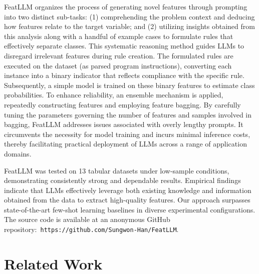 \textsf{FeatLLM} organizes the process of generating novel features through prompting into two distinct sub-tasks: (1) comprehending the problem context and deducing how features relate to the target variable; and (2) utilizing insights obtained from this analysis along with a handful of example cases to formulate rules that effectively separate classes. This systematic reasoning method guides LLMs to disregard irrelevant features during rule creation. The formulated rules are executed on the dataset (as parsed program instructions), converting each instance into a binary indicator that reflects compliance with the specific rule. Subsequently, a simple model is trained on these binary features to estimate class probabilities. To enhance reliability, an ensemble mechanism is applied, repeatedly constructing features and employing feature bagging. By carefully tuning the parameters governing the number of features and samples involved in bagging, \textsf{FeatLLM} addresses issues associated with overly lengthy prompts. It circumvents the necessity for model training and incurs minimal inference costs, thereby facilitating practical deployment of LLMs across a range of application domains.

\textsf{FeatLLM} was tested on 13 tabular datasets under low-sample conditions, demonstrating consistently strong and dependable results. Empirical findings indicate that LLMs effectively leverage both existing knowledge and information obtained from the data to extract high-quality features. Our approach surpasses state-of-the-art few-shot learning baselines in diverse experimental configurations. The source code is available at an anonymous GitHub repository:~\texttt{https://github.com/Sungwon-Han/FeatLLM}.

\section{Related Work}

